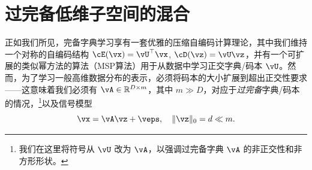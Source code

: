 \documentclass[../../book-main.tex]{subfiles}
\begin{document}
%



%

\section{过完备低维子空间的混合}
\label{sec:dictionary_learning}
正如我们所见，完备字典学习享有一套优雅的压缩自编码计算理论，其中我们维持一个对称的自编码结构 $\cE(\vx) = \vU^\top \vx$, $\cD(\vz) = \vU \vz$，并有一个可扩展的类似幂方法的算法（MSP算法）用于从数据中学习正交字典/码本 $\vU$。然而，为了学习一般高维数据分布的表示，必须将码本的大小扩展到超出正交性要求——这意味着我们必须有 $\vA \in \R^{D \times m}$，其中 $m \gg D$，对应于\textit{过完备}字典/码本的情况，\footnote{我们在这里将符号从 $\vU$ 改为 $\vA$，以强调过完备字典 $\vA$ 的非正交性和非方形形状。}以及信号模型
\begin{equation}\label{eq:model-DL-overcomplete}
    \vx =  \vA \vz + \veps,
    \quad
    \norm{\vz}_0 = d \ll m.
\end{equation}
\end{document}
